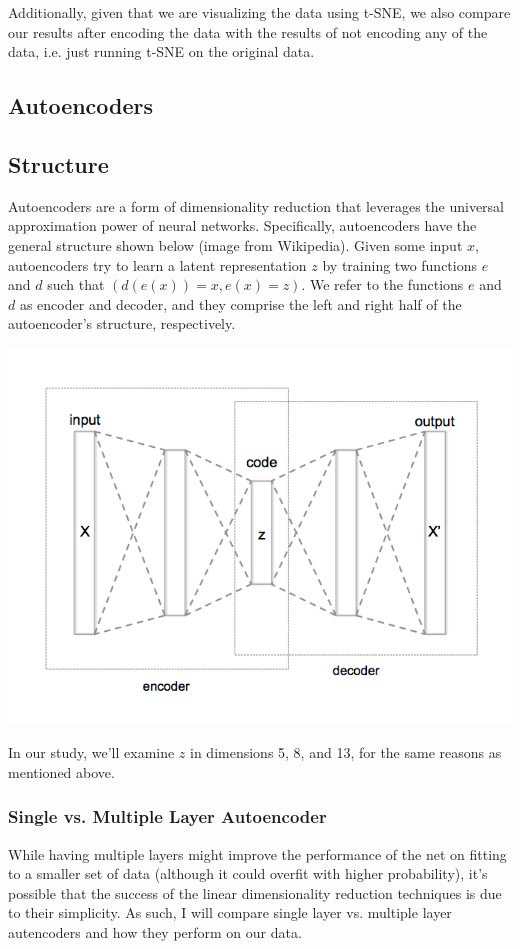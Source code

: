 \documentclass[12pt]{article}
\begin{document}
    Additionally, given that we are visualizing the data using t-SNE, we also compare our results after encoding the data with the results of not encoding any of the data, i.e. just running t-SNE on the original data.
    \subsection{Autoencoders}
    \subsection{Structure}
    Autoencoders are a form of dimensionality reduction that leverages the universal approximation power of neural networks. Specifically, autoencoders have the general structure shown below (image from Wikipedia). Given some input $x$, autoencoders try to learn a latent representation $z$ by training two functions $e$ and $d$ such that $(d(e(x)) = x, e(x) = z)$. We refer to the functions $e$ and $d$ as encoder and decoder, and they comprise the left and right half of the autoencoder's structure, respectively.
    \begin{center}
        \includegraphics[scale=0.5]{autoencoder-structure}
    \end{center}
    In our study, we'll examine $z$ in dimensions 5, 8, and 13, for the same reasons as mentioned above.
    \subsubsection{Single vs. Multiple Layer Autoencoder}
    While having multiple layers might improve the performance of the net on fitting to a smaller set of data (although it could overfit with higher probability), it's possible that the success of the linear dimensionality reduction techniques is due to their simplicity. As such, I will compare single layer vs. multiple layer autencoders and how they perform on our data.
\end{document}
